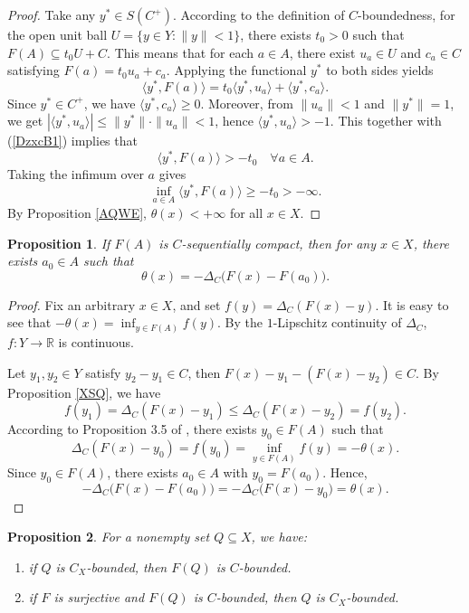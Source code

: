 \documentclass[11pt]{article}
\newtheorem{proposition}{Proposition}[section]
\begin{document}
\begin{proof}
	Take any $y^*\in S(C^+)$. According to the definition of $C$-boundedness, for    the open unit ball $U = \{y\in Y : \|y\| < 1\}$,  there exists $t_0 > 0$ such that
$	F(A) \subseteq t_0 U + C .$
	This means that for each $a\in A$, there exist $u_a \in U$ and $c_a \in C$ satisfying
$	F(a) = t_0 u_a + c_a .$
	Applying the functional $y^*$ to both sides yields
\begin{equation}\label{DzxcB1}
	\langle y^*, F(a)\rangle = t_0\langle y^*, u_a\rangle + \langle y^*, c_a\rangle .
 \end{equation}
	Since $y^*\in C^+$, we have $\langle y^*, c_a\rangle \ge 0$. Moreover, from $\|u_a\| < 1$ and $\|y^*\| = 1$, we get $|\langle y^*, u_a\rangle| \le \|y^*\|\cdot\|u_a\| < 1$, hence $\langle y^*, u_a\rangle > -1$. This together with  (\ref{DzxcB1})   implies that 
	\[
	\langle y^*, F(a)\rangle > -t_0 \quad \forall a\in A .
	\]
	Taking the infimum over $a$ gives
	\[
	\inf_{a\in A} \langle y^*, F(a)\rangle \ge -t_0 > -\infty .
	\]
	By Proposition \ref{AQWE}, $\theta(x)<+\infty$ for all $x\in X$.
\end{proof}

\begin{proposition}\label{XLJKD}
	If $F(A)$ is $C$-sequentially compact, then for any $x\in X$, there exists $a_0 \in A$ such that
	$$\theta(x) =  - {\Delta _C}\bigl( F(x) - F(a_0)\bigr).$$
\end{proposition}

\begin{proof}
	Fix an arbitrary $x\in X$, and set $f(y) = \Delta_C(F(x) - y)$.  It is easy to see  that $-\theta(x) = \inf_{y \in F(A)} f(y)$.
	By the $1$-Lipschitz continuity of $\Delta_C$, $f: Y \to \mathbb{R}$ is continuous.
	
	Let $y_1, y_2 \in Y$ satisfy $y_2 - y_1 \in C$, then $F(x) - y_1 - (F(x) - y_2) \in C$. By Proposition \ref{XSQ}, we have
	$$f(y_1) = {\Delta _C}(F(x) - y_1) \le {\Delta _C}(F(x) - y_2) = f(y_2).$$
	According to Proposition 3.5 of \cite{Han2025}, there exists $y_0 \in F(A)$ such that
	$${\Delta _C}(F(x) - y_0) = f(y_0) = \inf_{y \in F(A)} f(y) = -\theta(x).$$
	Since $y_0 \in F(A)$, there exists $a_0 \in A$ with $y_0 = F(a_0)$. Hence,
	$$- {\Delta _C}\bigl( F(x) - F(a_0)\bigr) = - {\Delta _C}\bigl( F(x) - y_0\bigr) = \theta(x).$$
\end{proof}

\begin{proposition} \label{QQB} 
	For a nonempty set $Q \subseteq X$, we have:
	\begin{enumerate}
		\item[(i)] if $Q$ is $C_X$-bounded, then $F(Q)$ is $C$-bounded.
		\item[(ii)] if $F$ is surjective  and   $F(Q)$ is $C$-bounded, then  $Q$ is $C_X$-bounded.
	\end{enumerate}
\end{proposition}
\end{document}
